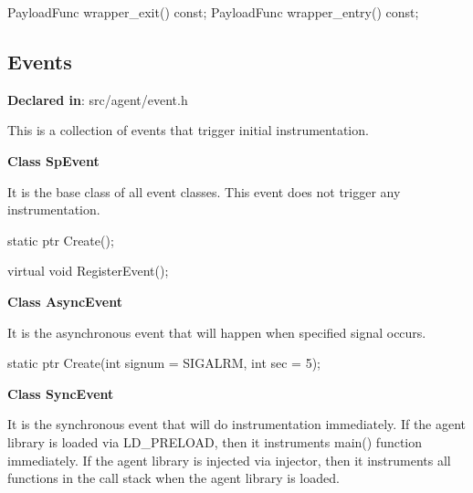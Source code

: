 \begin{apient}
PayloadFunc wrapper_exit() const;
PayloadFunc wrapper_entry() const;
\end{apient}

\subsection{Events}
\textbf{Declared in}: src/agent/event.h

This is a collection of events that trigger initial instrumentation.

\textbf{Class SpEvent}

It is the base class of all event classes. This event does not trigger any
instrumentation.

\begin{apient}
static ptr Create();
\end{apient}

\begin{apient}
virtual void RegisterEvent();
\end{apient}

\textbf{Class AsyncEvent}

It is the asynchronous event that will happen when specified signal occurs.

\begin{apient}
static ptr Create(int signum = SIGALRM,
                  int sec = 5);
\end{apient}

\textbf{Class SyncEvent}

It is the synchronous event that will do instrumentation immediately.
If the agent library is loaded via LD\_PRELOAD, then it instruments main()
function immediately.
If the agent library is injected via injector, then it instruments all functions
in the call stack when the agent library is loaded.

